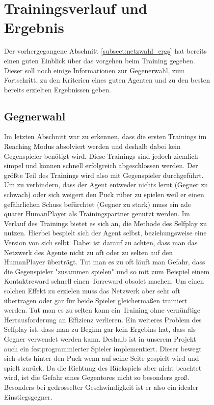 \begin{figure}[h]
\section{Trainingsverlauf und Ergebnis}
\label{sect:training_erg}

Der vorhergegangene Abschnitt \ref{subsect:netzwahl_ergs} hat bereits einen guten Einblick über das vorgehen beim Training gegeben. Dieser soll noch einige Informationen zur Gegenerwahl, zum Fortschritt, zu den Kriterien eines guten Agenten und zu den besten bereits erzielten Ergebnissen geben.

\subsection{Gegnerwahl}
\label{subsect:gegner}

Im letzten Abschnitt war zu erkennen, dass die ersten Trainings im Reaching Modus absolviert werden und deshalb dabei kein Gegenspieler benötigt wird. Diese Trainings sind jedoch ziemlich simpel und können schnell erfolgreich abgeschlossen werden. Der größte Teil des Trainings wird also mit Gegenspieler durchgeführt. Um zu verhindern, dass der Agent entweder nichts lernt (Gegner zu schwach) oder sich weigert den Puck rüber zu spielen weil er einen gefährlichen Schuss befürchtet (Gegner zu stark) muss ein ade	quater HumanPlayer als Trainingspartner genutzt werden. Im Verlauf des Trainings bietet es sich an, die Methode des Selfplay zu nutzen. Hierbei bespielt sich der Agent selbst, beziehungsweise eine Version von sich selbt. Dabei ist darauf zu achten, dass man das Netzwerk des Agente nicht zu oft oder zu selten auf den HumanPlayer überträgt. Tut man es zu oft läuft man Gefahr, dass die Gegenspieler "zusammen spielen" und so mit zum Beispiel einem Kontaktreward schnell einen Torreward obsolet machen. Um einen solchen Effekt zu erzielen muss das Netzwerk aber sehr oft übertragen oder gar für beide Spieler gleichermaßen trainiert werden. Tut man es zu selten kann ein Training ohne vernünftige Herrausforderung an Effizienz verlieren. Ein weiteres Problem des Selfplay ist, dass man zu Beginn gar kein Ergebins hat, dass als Gegner verwendet werden kann. Deshalb ist in unserem Projekt auch ein festprogrammierter Spieler implementiert. Dieser bewegt sich stets hinter den Puck wenn auf seine Seite gespielt wird und spielt zurück. Da die Richtung des Rückspiels aber nicht beachtet wird, ist die Gefahr eines Gegentores nicht so besonders groß. Besonders bei gedrosselter Geschwindigkeit ist er also ein idealer Einstiegsgegner.
\end{figure}
